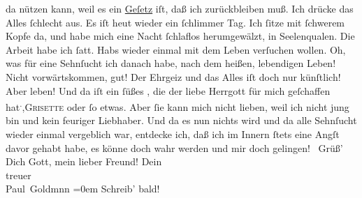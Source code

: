 \begin{ledgroupsized}[t]{13cm}
               da nützen kann, weil es ein \uline{Geſetz} iſt, daß ich
               zurückbleiben muß.\pend
           \pstart
           Ich drücke das Alles ſchlecht aus. Es iſt heut wieder
               ein ſchlimmer Tag. Ich ſitze mit ſchwerem Kopfe da, und habe mich eine Nacht
               ſchlaflos herumgewälzt, in Seelenqualen. Die Arbeit habe ich ſatt. Habs wieder einmal
               mit dem Leben verſuchen wollen. Oh, was für eine Sehnſucht ich danach habe, nach dem
               heißen, lebendigen {\pb}Leben! Nicht vorwärtskommen,
               gut! Der Ehrgeiz und das Alles iſt doch nur künſtlich! Aber leben! Und da iſt ein
               ſüßes \label{K_L02758-13v}\label{K_L02758-13h}, die der
               liebe Herrgott für mich geſchaffen hat\substVorne{}\textsuperscript{.}\substDazwischen{},\substHinten{}{ }\textsc{Grisette} oder ſo etwas. Aber ſie kann mich nicht lieben, weil ich nicht jung bin und
               kein feuriger Liebhaber. Und da es nun nichts wird und da alle Sehnſucht wieder
               einmal vergeblich war, entdecke ich, daß ich im Innern ſtets eine Angſt davor {\pb}gehabt habe, es könne doch wahr werden und mir doch
                  gelingen! {\dotsfour}\pend
           \pstart
           Grüß’ Dich Gott, mein lieber Freund!\pend
           \pstart
           Dein {\\[\baselineskip]}treuer {\\[\baselineskip]}\spacefill\mbox{Paul Goldmnn}\pend
           \leftskip=0em{}\pstart
           \noindent{}Schreib’ bald!\pend
           
         
         \endnumbering{}\end{ledgroupsized}  \newcommand{\dateiname}{L02758}\newcommand{\titel}{Paul Goldmann an Arthur Schnitzler, 5. 12. [1895]}\newcommand{\editorInnen}{Martin Anton Müller und Laura Untner}
      